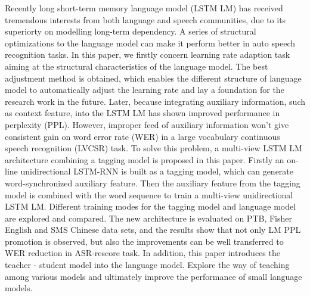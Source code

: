\begin{englishabstract}
Recently long short-term memory language model (LSTM LM) has received tremendous interests from both language and speech communities, 
due to its superiorty on modelling long-term dependency. 
A series of structural optimizations to the language model can make it perform better in auto speech recognition tasks.
In this paper, we firstly concern learning rate adaption task aiming at the structural characteristics of the language model.
The best adjustment method is obtained, which enables the different structure of language model to automatically adjust the learning rate and lay a foundation for the research work in the future.
Later, because integrating auxiliary information, 
such as context feature, into the LSTM LM has shown improved performance in perplexity (PPL). 
However, improper feed of auxiliary information won't give consistent gain on word error rate (WER) in a large vocabulary continuous speech recognition (LVCSR) task. 
To solve this problem, a multi-view LSTM LM architecture combining a tagging model is proposed in this paper.
 Firstly an on-line unidirectional LSTM-RNN is built as a tagging model, which can generate word-synchronized auxiliary feature. 
Then the auxiliary feature from the tagging model is combined with the word sequence to train a multi-view unidirectional LSTM LM. 
Different training modes for the tagging model and language model are explored and compared. The new architecture is evaluated on PTB, 
Fisher English and SMS Chinese data sets, and the results show that not only LM PPL promotion is observed, but also the improvements can be well transferred to WER reduction in ASR-rescore task.
In addition, this paper introduces the teacher - student model into the language model.
Explore the way of teaching among various models and ultimately improve the performance of small language models.
\end{englishabstract}


